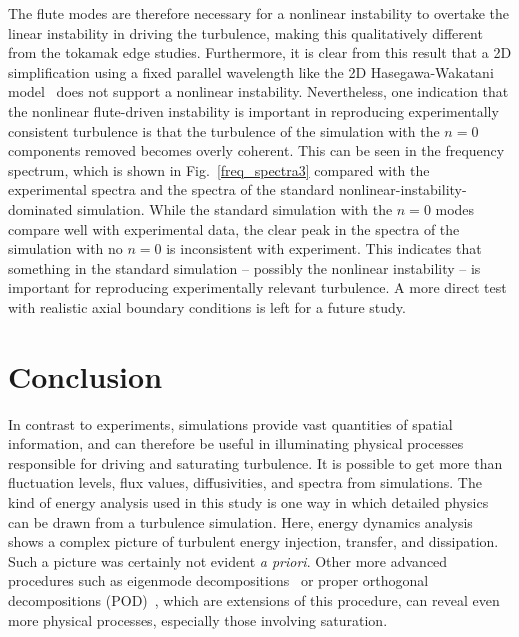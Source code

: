 \documentclass[showpacs,preprintnumbers,amsmath,amssymb,superscriptaddress,aip]{revtex4-1}
\begin{document}
The flute modes are therefore necessary for a nonlinear instability to overtake the linear instability in driving the turbulence, making this qualitatively different from the
tokamak edge studies. Furthermore, it is clear from this result that a 2D simplification
using a fixed parallel wavelength like the 2D Hasegawa-Wakatani model~\cite{hasegawa1983} does not support a nonlinear instability.
Nevertheless, one indication that the nonlinear flute-driven instability is important in reproducing experimentally consistent turbulence 
is that the turbulence of the simulation with the $n=0$ components removed becomes overly coherent. This can be seen in the
frequency spectrum, which is shown in
Fig.~\ref{freq_spectra3} compared with the experimental spectra and
the spectra of the standard nonlinear-instability-dominated
simulation. While the standard simulation with the $n=0$ modes compare
well with experimental data, 
the clear peak in the spectra of the simulation with no $n=0$ is
inconsistent with experiment.  This indicates that something in the standard simulation -- possibly
the nonlinear instability -- is important for reproducing experimentally relevant turbulence. A more direct test with realistic axial boundary conditions is left for a future study.


\section{Conclusion}

In contrast to experiments, simulations provide vast quantities of spatial information, and can therefore be useful in illuminating physical processes responsible for driving and saturating
turbulence. It is possible to get more than fluctuation levels, flux values, diffusivities, and spectra from simulations. The kind of energy analysis used in this study is one 
way in which detailed physics can be drawn from a turbulence simulation. Here, energy dynamics analysis shows a complex picture of turbulent energy injection, transfer, and dissipation. 
Such a picture was certainly not evident \emph{a priori}.
Other more advanced procedures such as eigenmode decompositions~\cite{baver2002} or proper orthogonal decompositions (POD)~\cite{hatch2011}, which are extensions of this procedure,
can reveal even more physical processes, especially those involving saturation. 
\end{document}
